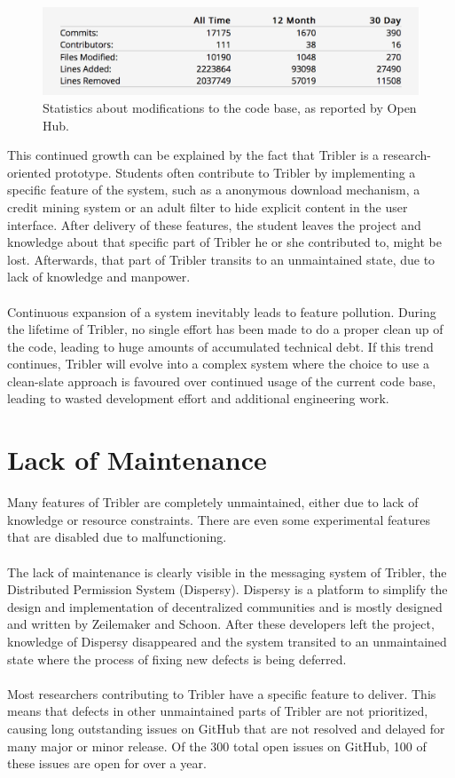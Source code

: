 \begin{figure}[h!]
	\centering
	\includegraphics[width=0.7\columnwidth]{images/openhub_commits_table}
	\caption{Statistics about modifications to the code base, as reported by Open Hub.}
	\label{fig:openhub-commit-stats}
\end{figure}

\noindent This continued growth can be explained by the fact that Tribler is a research-oriented prototype. Students often contribute to Tribler by implementing a specific feature of the system, such as a anonymous download mechanism, a credit mining system or an adult filter to hide explicit content in the user interface. After delivery of these features, the student leaves the project and knowledge about that specific part of Tribler he or she contributed to, might be lost. Afterwards, that part of Tribler transits to an unmaintained state, due to lack of knowledge and manpower.\\\\
Continuous expansion of a system inevitably leads to feature pollution. During the lifetime of Tribler, no single effort has been made to do a proper clean up of the code, leading to huge amounts of accumulated technical debt. If this trend continues, Tribler will evolve into a complex system where the choice to use a clean-slate approach is favoured over continued usage of the current code base, leading to wasted development effort and additional engineering work.

\section{Lack of Maintenance}
Many features of Tribler are completely unmaintained, either due to lack of knowledge or resource constraints. There are even some experimental features that are disabled due to malfunctioning.\\\\
The lack of maintenance is clearly visible in the messaging system of Tribler, the Distributed Permission System (Dispersy). Dispersy is a platform to simplify the design and implementation of decentralized communities and is mostly designed and written by Zeilemaker and Schoon\cite{zeilemaker2013dispersy}. After these developers left the project, knowledge of Dispersy disappeared and the system transited to an unmaintained state where the process of fixing new defects is being deferred.\\\\
Most researchers contributing to Tribler have a specific feature to deliver. This means that defects in other unmaintained parts of Tribler are not prioritized, causing long outstanding issues on GitHub that are not resolved and delayed for many major or minor release. Of the 300 total open issues on GitHub, 100 of these issues are open for over a year.
 
